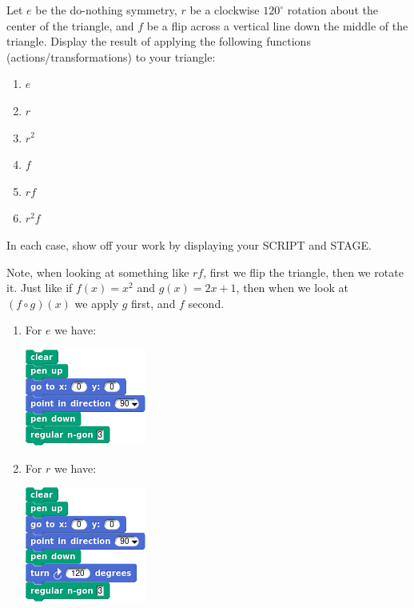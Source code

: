 \documentclass[noauthor,nooutcomes,hints,handout]{ximera}
\begin{document}
\begin{question}
  Let $e$ be the do-nothing symmetry, $r$ be a clockwise $120^\circ$
  rotation about the center of the triangle, and $f$ be a flip across
  a vertical line down the middle of the triangle. Display the result
  of applying the following functions (actions/transformations) to
  your triangle:
  \begin{enumerate}
  \item $e$
  \item $r$
  \item $r^2$
  \item $f$
  \item $rf$
  \item $r^2 f$
  \end{enumerate}
  In each case, show off your work by displaying your SCRIPT and
  STAGE.
  \begin{hint}
    Note, when looking at something like $rf$, first we flip the
    triangle, then we rotate it. Just like if $f(x) = x^2$ and $g(x) =
    2x+1$, then when we look at $(f\circ g)(x)$ we apply $g$ first,
    and $f$ second.
  \end{hint}
  \begin{freeResponse}
    \begin{enumerate}
    \item For $e$ we have:
      \begin{center}
        \includegraphics[width=.3\textwidth]{eTriSCRIPT.png}   \qquad {}
      \end{center}
    \item For $r$ we have:
      \begin{center}
        \includegraphics[width=.3\textwidth]{rTriSCRIPT.png}   \qquad {}

\end{center}
\end{enumerate}
\end{freeResponse}
\end{question}
\end{document}
